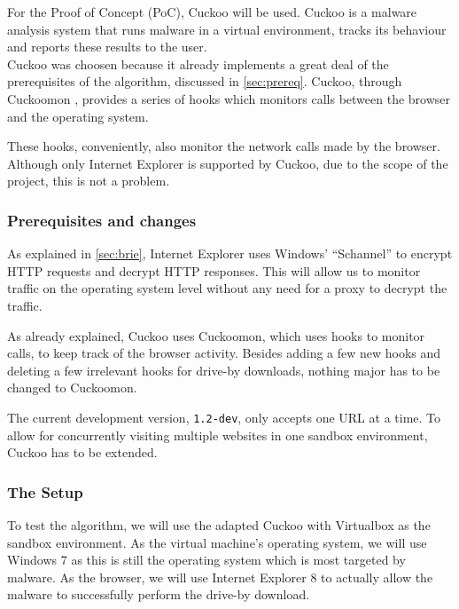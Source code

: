 
For the Proof of Concept (PoC), Cuckoo \cite{cuckoo} will be used. Cuckoo is a malware analysis system that runs malware in a virtual environment, tracks its behaviour and reports these results to the user.\\

Cuckoo was choosen because it already implements a great deal of the prerequisites of the algorithm, discussed in \ref{sec:prereq}. Cuckoo, through Cuckoomon \cite{cuckoomon}, provides a series of hooks which monitors calls between the browser and the operating system.

These hooks, conveniently, also monitor the network calls made by the browser. Although only Internet Explorer is supported by Cuckoo, due to the scope of the project, this is not a problem.

\subsubsection{Prerequisites and changes}

As explained in \ref{sec:brie}, Internet Explorer uses Windows' ``Schannel'' \cite{schannel} to encrypt HTTP requests and decrypt HTTP responses. This will allow us to monitor traffic on the operating system level without any need for a proxy to decrypt the traffic.

As already explained, Cuckoo uses Cuckoomon, which uses hooks to monitor calls, to keep track of the browser activity. Besides adding a few new hooks and deleting a few irrelevant hooks for drive-by downloads, nothing major has to be changed to Cuckoomon.

The current development version, \texttt{1.2-dev},  only accepts one URL at a time. To allow for concurrently visiting multiple websites in one sandbox environment, Cuckoo has to be extended.

\subsubsection{The Setup}

To test the algorithm, we will use the adapted Cuckoo with Virtualbox as the sandbox environment. As the virtual machine's operating system, we will use Windows 7 as this is still the operating system which is most targeted by malware. As the browser, we will use Internet Explorer 8 to actually allow the malware to successfully perform the drive-by download.

